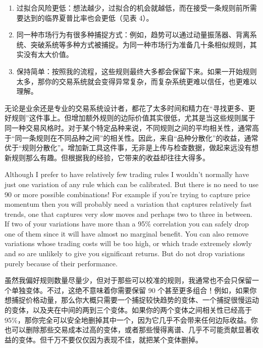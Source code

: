 \begin{enumerate}
\item 过拟合风险更低：想法越少，过拟合的机会就越低，而在接受一条规则前所需要达到的临界夏普比率也会更低（见表 4）。
\item 同一种市场行为有很多种捕捉方式：例如，趋势可以通过动量振荡器、背离系统、突破系统等多种方式被捕捉。为同一种市场行为准备几十条相似规则，其实没有太大价值。
\item 保持简单：按照我的流程，这些规则最终大多都会保留下来。如果一开始规则太多，那你的交易系统就会变得异常复杂，而复杂系统更难以信任，也更难以理解。\end{enumerate}
无论是业余还是专业的交易系统设计者，都花了太多时间和精力在“寻找更多、更好规则”这件事上。但增加额外规则的边际价值其实很低，尤其是当这些规则属于同一种交易风格时。对于某个特定品种来说，不同规则之间的平均相关性，通常高于“同一条规则在不同品种之间”的相关性。因此，来自“品种分散化”的收益，通常优于“规则分散化”。增加新工具这件事，无非是上传与检查数据，做起来远没有想新规则那么有趣。但根据我的经验，它带来的收益却往往大得多。


\begin{englishblock} Although I prefer to have relatively few trading rules I wouldn't normally have just one variation of any rule which can be calibrated. But there is no need to use 90 or more possible combinations! For example if you're trying to capture price momentum then you will probably need a variation that captures relatively fast trends, one that captures very slow moves and perhaps two to three in between. If two of your variations have more than a 95\% correlation you can safely drop one of them since it will have almost no marginal benefit. You can also remove variations whose trading costs will be too high, or which trade extremely slowly and so are unlikely to give you significant returns. But do not drop variations purely because of their performance. \end{englishblock}

\begin{chineseblock}虽然我偏好规则数量尽量少，但对于那些可以校准的规则，我通常也不会只保留一个单独变体。不过，这绝不意味着你需要保留 90 个甚至更多组合！例如，如果你想捕捉价格动量，那么你大概只需要一个捕捉较快趋势的变体、一个捕捉很慢运动的变体，以及夹在中间的两到三个变体。如果你的两个变体之间相关性已经高于 95\%，那你完全可以安全地删掉其中一个，因为它几乎不会带来任何边际收益。你也可以删除那些交易成本过高的变体，或者那些慢得离谱、几乎不可能贡献显著收益的变体。但千万不要仅仅因为表现不佳，就把某个变体删掉。\end{chineseblock}

